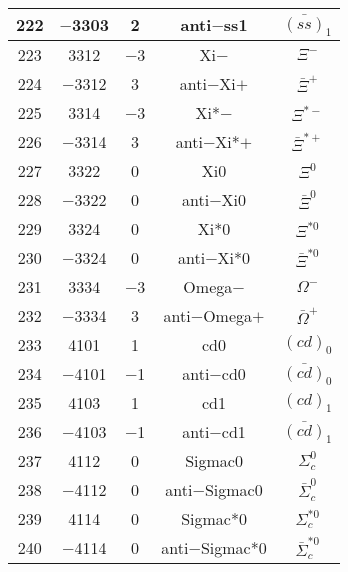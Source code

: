 \documentclass{article}
\begin{document}
\begin{table}[!htbp]
\begin{tabular}{|c|c|c|c|c|}
\hline
222 & $-$3303 & 2 & anti$-$ss\underline{\hspace{0.6em}}1 & $\bar{(ss)}_{1}$ \\
\hline
223 & 3312 & $-$3 & Xi$-$ & $\Xi^{-}$ \\
\hline
224 & $-$3312 & 3 & anti$-$Xi$+$ & $\bar{\Xi}^{+}$ \\
\hline
225 & 3314 & $-$3 & Xi*$-$ & $\Xi^{*-}$ \\
\hline
226 & $-$3314 & 3 & anti$-$Xi*$+$ & $\bar{\Xi}^{*+}$ \\
\hline
227 & 3322 & 0 & Xi0 & $\Xi^{0}$ \\
\hline
228 & $-$3322 & 0 & anti$-$Xi0 & $\bar{\Xi}^{0}$ \\
\hline
229 & 3324 & 0 & Xi*0 & $\Xi^{*0}$ \\
\hline
230 & $-$3324 & 0 & anti$-$Xi*0 & $\bar{\Xi}^{*0}$ \\
\hline
231 & 3334 & $-$3 & Omega$-$ & $\Omega^{-}$ \\
\hline
232 & $-$3334 & 3 & anti$-$Omega$+$ & $\bar{\Omega}^{+}$ \\
\hline
233 & 4101 & 1 & cd\underline{\hspace{0.6em}}0 & $(cd)_{0}$ \\
\hline
234 & $-$4101 & $-$1 & anti$-$cd\underline{\hspace{0.6em}}0 & $\bar{(cd)}_{0}$ \\
\hline
235 & 4103 & 1 & cd\underline{\hspace{0.6em}}1 & $(cd)_{1}$ \\
\hline
236 & $-$4103 & $-$1 & anti$-$cd\underline{\hspace{0.6em}}1 & $\bar{(cd)}_{1}$ \\
\hline
237 & 4112 & 0 & Sigma\underline{\hspace{0.6em}}c0 & $\Sigma_{c}^{0}$ \\
\hline
238 & $-$4112 & 0 & anti$-$Sigma\underline{\hspace{0.6em}}c0 & $\bar{\Sigma}_{c}^{0}$ \\
\hline
239 & 4114 & 0 & Sigma\underline{\hspace{0.6em}}c*0 & $\Sigma_{c}^{*0}$ \\
\hline
240 & $-$4114 & 0 & anti$-$Sigma\underline{\hspace{0.6em}}c*0 & $\bar{\Sigma}_{c}^{*0}$ \\
\hline
\end{tabular}
\end{table}

\clearpage
\end{document}
